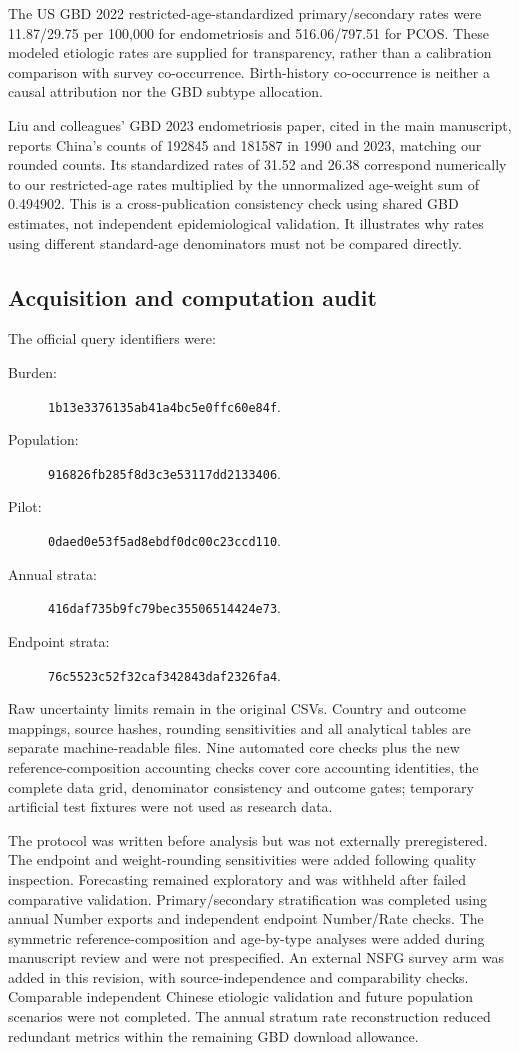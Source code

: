 \documentclass[11pt,a4paper]{article}
\begin{document}
The US GBD 2022 restricted-age-standardized primary/secondary rates were 11.87/29.75 per 100,000 for endometriosis and 516.06/797.51 for PCOS. These modeled etiologic rates are supplied for transparency, rather than a calibration comparison with survey co-occurrence. Birth-history co-occurrence is neither a causal attribution nor the GBD subtype allocation.

Liu and colleagues' GBD 2023 endometriosis paper, cited in the main manuscript, reports China's counts of 192845 and 181587 in 1990 and 2023, matching our rounded counts. Its standardized rates of 31.52 and 26.38 correspond numerically to our restricted-age rates multiplied by the unnormalized age-weight sum of 0.494902. This is a cross-publication consistency check using shared GBD estimates, not independent epidemiological validation. It illustrates why rates using different standard-age denominators must not be compared directly.

\subsection{Acquisition and computation audit}
The official query identifiers were:
\begin{description}
\item[Burden:] \texttt{1b13e3376135ab41a4bc5e0ffc60e84f}.
\item[Population:] \texttt{916826fb285f8d3c3e53117dd2133406}.
\item[Pilot:] \texttt{0daed0e53f5ad8ebdf0dc00c23ccd110}.
\item[Annual strata:] \texttt{416daf735b9fc79bec35506514424e73}.
\item[Endpoint strata:] \texttt{76c5523c52f32caf342843daf2326fa4}.
\end{description}
Raw uncertainty limits remain in the original CSVs. Country and outcome mappings, source hashes, rounding sensitivities and all analytical tables are separate machine-readable files. Nine automated core checks plus the new reference-composition accounting checks cover core accounting identities, the complete data grid, denominator consistency and outcome gates; temporary artificial test fixtures were not used as research data.

The protocol was written before analysis but was not externally preregistered. The endpoint and weight-rounding sensitivities were added following quality inspection. Forecasting remained exploratory and was withheld after failed comparative validation. Primary/secondary stratification was completed using annual Number exports and independent endpoint Number/Rate checks. The symmetric reference-composition and age-by-type analyses were added during manuscript review and were not prespecified. An external NSFG survey arm was added in this revision, with source-independence and comparability checks. Comparable independent Chinese etiologic validation and future population scenarios were not completed. The annual stratum rate reconstruction reduced redundant metrics within the remaining GBD download allowance.
\end{document}
